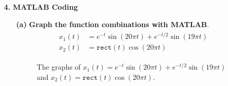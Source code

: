 \documentclass[a4paper, 12pt]{article}
\begin{document}
\pagebreak
\begin{itemize}
\item[\textbf{4.}]{\textbf{MATLAB Coding}}
\begin{itemize}
\item[\textbf{(a)}]{\textbf{Graph the function combinations with MATLAB}.}
\begin{equation}
\begin{gathered}
\begin{alignedat}{1}
x_{1}(t) &= e^{-t} \sin \left( 20 \pi t \right) + e^{-t/2} \sin \left(19 \pi t \right) \\
x_{2}(t) &= \mathtt{rect}(t) \cos \left(20 \pi t \right)
\end{alignedat}
\end{gathered}
\end{equation}

\begin{tcolorbox}[title={Source Code}]

\end{tcolorbox}

\pagebreak
\begin{tcolorbox}[title={Unit-rectangle Function}]

\end{tcolorbox}

\begin{figure}[h!]
\caption{\label{fig:4a}The graphs of $x_{1}(t) = e^{-t} \sin \left( 20 \pi t \right) + e^{-t/2} \sin \left(19 \pi t \right)$ and $x_{2}(t) = \mathtt{rect}(t) \cos \left(20 \pi t \right)$.}
\end{figure}


\end{itemize}
\end{itemize}
\end{document}
